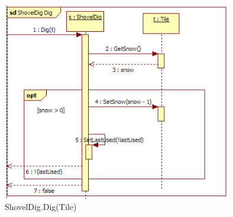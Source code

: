 \begin{figure}[H]
	\begin{center}
		\includegraphics[width=10cm]{chapters/chapter03/seqdiag/ShovelDig_Dig.png}
		\caption{ShovelDig.Dig(Tile)}
		\label{fig:ShovelDigDig}
	\end{center}
\end{figure}





